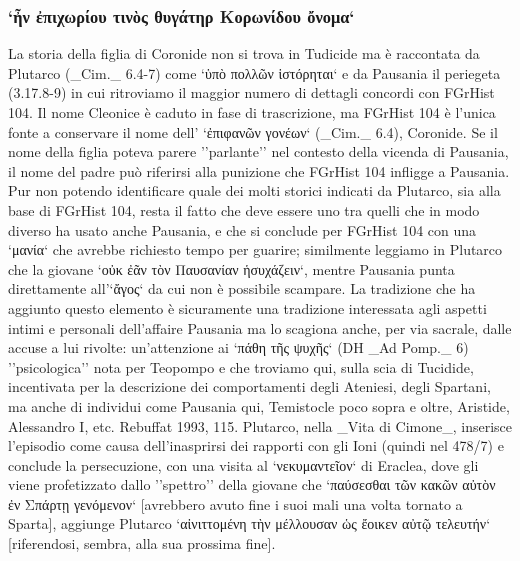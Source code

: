             \subsubsection{`ἦν ἐπιχωρίου τινὸς θυγάτηρ Κορωνίδου ὄνομα`}
            La storia della figlia di Coronide non si trova in Tudicide ma è raccontata da  Plutarco (_Cim._ 6.4-7) come `ὑπὸ πολλῶν ἱστόρηται` e da Pausania il periegeta (3.17.8-9) in cui ritroviamo il maggior numero di dettagli concordi con FGrHist 104. Il nome Cleonice è caduto in fase di trascrizione, ma FGrHist 104 è l'unica fonte a conservare il nome dell' `ἐπιφανῶν γονέων` (_Cim._ 6.4), Coronide. Se il nome della figlia poteva parere ''parlante'' nel contesto della vicenda di Pausania, il nome del padre può riferirsi alla punizione che FGrHist 104 infligge a Pausania. Pur non potendo identificare quale dei molti storici indicati da Plutarco, sia alla base di FGrHist 104, resta il fatto che deve essere uno tra quelli che in modo diverso ha usato anche Pausania, e che si conclude per FGrHist 104 con una `μανία` che avrebbe richiesto tempo per guarire; similmente leggiamo in Plutarco che la giovane  `οὐκ ἐᾶν τὸν Παυσανίαν ἡσυχάζειν`, mentre Pausania punta direttamente all'`ἄγος` da cui non è possibile scampare. La tradizione che ha aggiunto questo elemento è sicuramente una tradizione interessata agli aspetti intimi e personali dell'affaire Pausania  ma lo scagiona anche, per via sacrale, dalle accuse a lui rivolte: un'attenzione ai `πάθη τῆς ψυχῆς` (DH _Ad Pomp._ 6) ''psicologica'' nota per Teopompo  e che troviamo qui, sulla scia di Tucidide, incentivata per la descrizione dei comportamenti degli Ateniesi, degli Spartani, ma anche di individui come Pausania  qui, Temistocle poco sopra e oltre, Aristide, Alessandro I, etc. Rebuffat 1993, 115. Plutarco, nella _Vita di Cimone_, inserisce l'episodio come causa dell'inasprirsi dei rapporti con gli Ioni (quindi nel 478/7) e conclude la persecuzione, con una visita al `νεκυμαντεῖον` di Eraclea, dove gli viene profetizzato dallo ''spettro'' della giovane che `παύσεσθαι τῶν κακῶν αὐτὸν ἐν Σπάρτῃ γενόμενον` [avrebbero avuto fine i suoi mali una volta tornato a Sparta], aggiunge Plutarco `αἰνιττομένη τὴν μέλλουσαν ὡς ἔοικεν αὐτῷ τελευτήν` [riferendosi, sembra, alla sua prossima fine]. 
